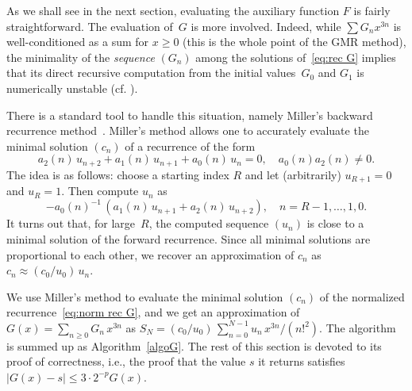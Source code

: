 \documentclass[10pt, conference]{IEEEtran}
\newcommand{\ttarget}{p}
\begin{document}
As we shall see in the next section, evaluating the auxiliary function $F$ is fairly straightforward.
The evaluation of~$G$ is more involved.
Indeed, while $\sum G_n x^{3n}$ is well-conditioned as a sum for $x \geq 0$ (this is the whole point of the GMR method), the minimality of the \emph{sequence} $(G_n)$ among the solutions of~\eqref{eq:rec G} implies that its direct recursive computation from the initial values~$G_0$ and $G_1$ is numerically unstable (cf. \cite{Wimp1984}).


There is a standard tool to handle this situation, namely Miller's backward recurrence method~{\cite{BickleyComrieMillerSadlerThompson1952,Wimp1984}}. Miller's method allows one to accurately evaluate the minimal solution $(c_n)$ of a recurrence of the form
\begin{equation}
  a_2(n)\,u_{n+2} + a_1(n)\,u_{n+1} + a_0(n)\,u_n = 0, \quad a_0(n) a_2(n) \neq 0. \label{eq:rec general form}
\end{equation}
The idea is as follows: choose a starting index $R$ and let (arbitrarily) $u_{R+1} = 0$ and $u_R = 1$. Then compute $u_n$ as
\[ -a_0(n)^{-1}\,(a_1(n)\,u_{n+1} + a_2(n)\,u_{n+2}), \quad n=R-1, \dots, 1, 0. \]
It turns out that, for large~$R$, the computed sequence $(u_n)$ is close to a minimal solution of the forward recurrence. Since all minimal solutions are proportional to each other, we recover an approximation of $c_n$ as $c_n \approx (c_0/u_0)\,u_n$.

We use Miller's method to evaluate the minimal solution $(c_n)$ of the normalized recurrence~\eqref{eq:norm rec G}, and we get an approximation of $G(x) = \sum_{n \ge 0} G_n\,x^{3n}$ as $S_N = (c_0/u_0)\,\sum_{n=0}^{N-1} u_n\,x^{3n}/(n!^2)$.
The algorithm is summed up as Algorithm~\ref{algoG}. The rest of this section is devoted to its proof of correctness, i.e., the proof that the value $s$ it returns satisfies $|G(x)-s| \le 3 \cdot 2^{-\ttarget} G(x)$.
\end{document}
